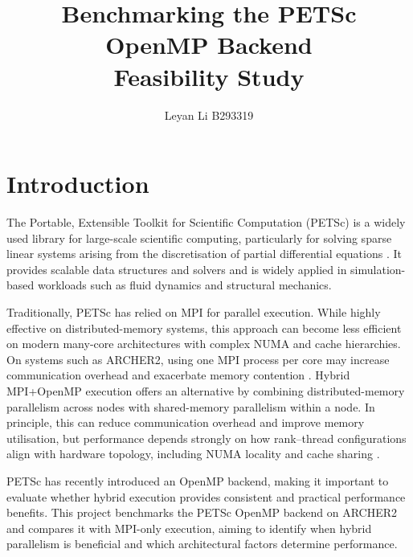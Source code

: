 \documentclass{article}
\begin{document}
\indentedparagraphing

\title{\rmfamily Benchmarking the PETSc OpenMP Backend
 \\%
	\vspace{1em} \large{\sffamily Feasibility Study}
}

\author{Leyan Li B293319} %
\date{}


\makeEPCCtitle
\thispagestyle{empty}

\newpage
{}





\section{Introduction}\label{s:intro}


The Portable, Extensible Toolkit for Scientific Computation (PETSc) is a widely used library for large-scale scientific computing, particularly for solving sparse linear systems arising from the discretisation of partial differential equations \cite{petsc_balay2019}. 
It provides scalable data structures and solvers and is widely applied in simulation-based workloads such as fluid dynamics and structural mechanics.

Traditionally, PETSc has relied on MPI for parallel execution. 
While highly effective on distributed-memory systems, this approach can become less efficient on modern many-core architectures with complex NUMA and cache hierarchies. 
On systems such as ARCHER2, using one MPI process per core may increase communication overhead and exacerbate memory contention \cite{archer2_hardware}.
Hybrid MPI+OpenMP execution offers an alternative by combining distributed-memory parallelism across nodes with shared-memory parallelism within a node. 
In principle, this can reduce communication overhead and improve memory utilisation, but performance depends strongly on how rank--thread configurations align with hardware topology, including NUMA locality and cache sharing \cite{judge2022mpiopenmp}.

PETSc has recently introduced an OpenMP backend, making it important to evaluate whether hybrid execution provides consistent and practical performance benefits. 
This project benchmarks the PETSc OpenMP backend on ARCHER2 and compares it with MPI-only execution, aiming to identify when hybrid parallelism is beneficial and which architectural factors determine performance.
\end{document}
